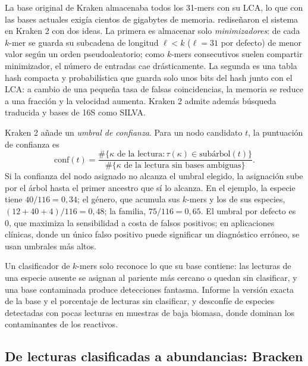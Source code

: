 La base original de Kraken almacenaba todos los 31-mers con su LCA, lo que con las bases actuales exigía cientos de gigabytes de memoria. \textcite{c14-wood2019} rediseñaron el sistema en Kraken 2 con dos ideas. La primera es almacenar solo \emph{minimizadores}: de cada $k$-mer se guarda su subcadena de longitud $\ell<k$ ($\ell=31$ por defecto) de menor valor según un orden pseudoaleatorio; como $k$-mers consecutivos suelen compartir minimizador, el número de entradas cae drásticamente. La segunda es una tabla hash compacta y probabilística que guarda solo unos bits del hash junto con el LCA: a cambio de una pequeña tasa de falsas coincidencias, la memoria se reduce a una fracción y la velocidad aumenta. Kraken 2 admite además búsqueda traducida y bases de 16S como SILVA.

Kraken 2 añade un \emph{umbral de confianza}. Para un nodo candidato $t$, la puntuación de confianza es
\begin{equation}\label{eq:14-conf}
\mathrm{conf}(t) = \frac{\#\{\kappa \text{ de la lectura}: \tau(\kappa) \in \mathrm{subárbol}(t)\}}{\#\{\kappa \text{ de la lectura sin bases ambiguas}\}}.
\end{equation}
Si la confianza del nodo asignado no alcanza el umbral elegido, la asignación sube por el árbol hasta el primer ancestro que sí lo alcanza. En el ejemplo, la especie tiene $40/116=0{,}34$; el género, que acumula sus $k$-mers y los de sus especies, $(12+40+4)/116 = 0{,}48$; la familia, $75/116 = 0{,}65$. El umbral por defecto es 0, que maximiza la sensibilidad a costa de falsos positivos; en aplicaciones clínicas, donde un único falso positivo puede significar un diagnóstico erróneo, se usan umbrales más altos.

\begin{cuidado}
Un clasificador de $k$-mers solo reconoce lo que su base contiene: las lecturas de una especie ausente se asignan al pariente más cercano o quedan sin clasificar, y una base contaminada produce detecciones fantasma. Informe la versión exacta de la base y el porcentaje de lecturas sin clasificar, y desconfíe de especies detectadas con pocas lecturas en muestras de baja biomasa, donde dominan los contaminantes de los reactivos.
\end{cuidado}

\subsection{De lecturas clasificadas a abundancias: Bracken}

